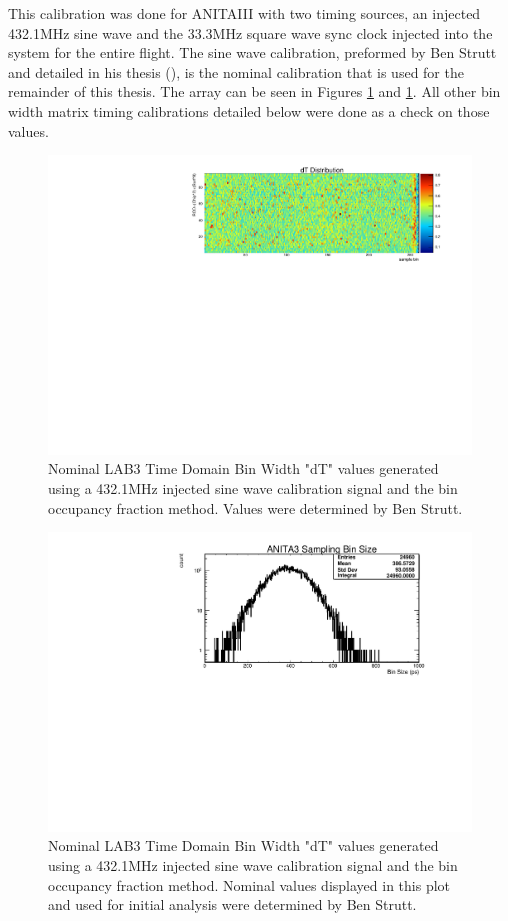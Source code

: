 		This calibration was done for ANITAIII with two timing sources, an injected 432.1MHz sine wave and the 33.3MHz square wave sync clock injected into the system for the entire flight.  The sine wave calibration, preformed by Ben Strutt and detailed in his thesis (\cite{BenSThesis}), is the nominal calibration that is used for the remainder of this thesis.  The array can be seen in Figures \ref{fig:dTNominal2D} and \ref{fig:dTNominal2D}.  All other bin width matrix timing calibrations detailed below were done as a check on those values.
		
	\begin{figure}
		\includegraphics[width=\textwidth]{figures/dTNominal2D}
		\caption{Nominal LAB3 Time Domain Bin Width "dT" values generated using a 432.1MHz injected sine wave calibration signal and the bin occupancy fraction method.  Values were determined by Ben Strutt\cite{BenSThesis}.}
		\label{fig:dTNominal2D}
	\end{figure}
	
	
	\begin{figure}
		\includegraphics[width=\textwidth]{figures/dTNominal}
		\caption{Nominal LAB3 Time Domain Bin Width "dT" values generated using a 432.1MHz injected sine wave calibration signal and the bin occupancy fraction method.  Nominal values displayed in this plot and used for initial analysis were determined by Ben Strutt\cite{BenSThesis}.}
		\label{fig:dTNominal}
	\end{figure}
		
